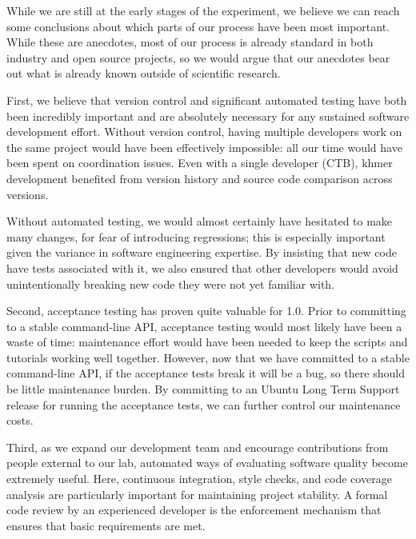 \documentclass[12pt]{article}
\begin{document}


While we are still at the early stages of the experiment, we believe
we can reach some conclusions about which parts of our process have
been most important.  While these are anecdotes, most of our process
is already standard in both industry and open source projects, so we
would argue that our anecdotes bear out what is already known outside
of scientific research.

First, we believe that version control and significant automated
testing have both been incredibly important and are absolutely
necessary for any sustained software development effort.  Without
version control, having multiple developers work on the same project
would have been effectively impossible: all our time would have been
spent on coordination issues.  Even with a single developer (CTB),
khmer development benefited from version history and source code
comparison across versions.

Without automated testing, we would almost certainly have hesitated to
make many changes, for fear of introducing regressions; this is
especially important given the variance in software engineering
expertise.  By insisting that new code have tests associated with it,
we also ensured that other developers would avoid unintentionally breaking
new code they were not yet familiar with.

Second, acceptance testing has proven quite valuable for 1.0.  Prior
to committing to a stable command-line API, acceptance testing would
most likely have been a waste of time: maintenance effort would have
been needed to keep the scripts and tutorials working well together.
However, now that we have committed to a stable command-line API, if
the acceptance tests break it will be a bug, so there should be little
maintenance burden.  By committing to an Ubuntu Long Term Support
release for running the acceptance tests, we can further control our
maintenance costs.

Third, as we expand our development team and encourage contributions
from people external to our lab, automated ways of evaluating software
quality become extremely useful.  Here, continuous integration, style
checks, and code coverage analysis are particularly important for
maintaining project stability.  A formal code review by an experienced
developer is the enforcement mechanism that ensures that basic requirements
are met.
\end{document}
